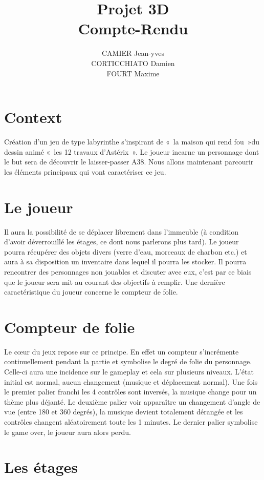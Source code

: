 \documentclass[a4paper,10pt]{article}
\title{Projet 3D\\
Compte-Rendu}
\author{CAMIER Jean-yves \\
CORTICCHIATO Damien \\
FOURT Maxime}
\begin{document}
\maketitle

\section{Context}

Création d'un jeu de type labyrinthe s'inspirant de « la maison qui rend fou »du dessin animé « les 12 travaux d'Astérix ». Le joueur incarne un personnage dont le but sera de découvrir le laisser-passer A38. Nous allons maintenant parcourir les éléments principaux qui vont caractériser ce jeu.

\section{Le joueur}

Il aura la possibilité de se déplacer librement dans l'immeuble (à condition d'avoir déverrouillé les étages, ce dont nous parlerons plus tard). Le joueur pourra récupérer des objets divers (verre d'eau, morceaux de charbon etc.) et aura à sa disposition un inventaire dans lequel il pourra les stocker. Il pourra rencontrer des personnages non jouables et discuter avec eux, c'est par ce biais que le joueur sera mit au courant des objectifs à remplir. Une dernière caractéristique du joueur concerne le compteur de folie.

\section{Compteur de folie}

Le cœur du jeux repose sur ce principe. En effet un compteur s'incrémente continuellement pendant la partie et symbolise le degré de folie du personnage. Celle-ci aura une incidence sur le gameplay et cela sur plusieurs niveaux. L'état initial est normal, aucun changement (musique et déplacement normal). Une fois le premier palier franchi les 4 contrôles sont inversés, la musique change pour un thème plus déjanté.  Le deuxième palier voir apparaître un changement d'angle de vue (entre 180 et 360 degrés), la musique devient totalement dérangée et les contrôles changent aléatoirement toute les 1 minutes. Le dernier palier symbolise le game over, le joueur aura alors perdu.

\section{Les étages}
\end{document}
